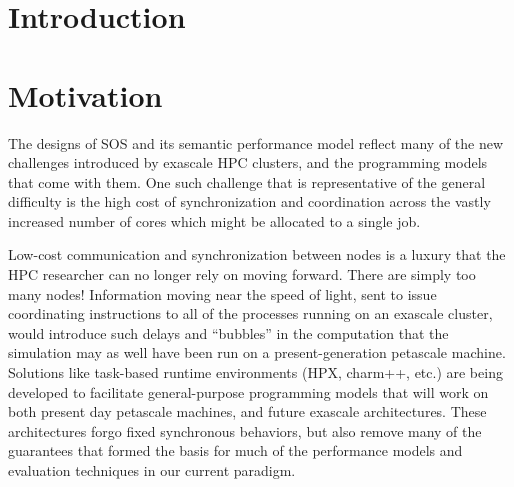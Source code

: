 
\section{Introduction}


\section{Motivation}

The designs of SOS and its semantic performance model reflect many of
the new challenges introduced by exascale HPC clusters, and the
programming models that come with them. One such challenge that is
representative of the general difficulty is the high cost of
synchronization and coordination across the vastly increased number of
cores which might be allocated to a single job.

Low-cost communication and synchronization between nodes is a luxury
that the HPC researcher can no longer rely on moving forward. There
are simply too many nodes! Information moving near the speed of light,
sent to issue coordinating instructions to all of the processes
running on an exascale cluster, would introduce such delays and
``bubbles'' in the computation that the simulation may as well have
been run on a present-generation petascale
machine.  Solutions like task-based runtime
environments (HPX, charm++, etc.)  are being developed to facilitate
general-purpose programming models that will work on both present day
petascale machines, and future exascale architectures. These
architectures forgo fixed synchronous behaviors, but also remove many
of the guarantees that formed the basis for much of the performance
models and evaluation techniques in our current paradigm.

